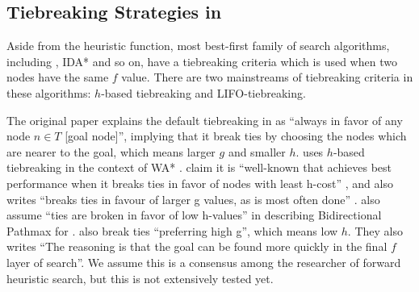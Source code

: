 


\subsection{Tiebreaking Strategies in \astar}

Aside from the heuristic function, most best-first family of search
algorithms, including \astar, IDA* and so on, have a tiebreaking criteria which is used
when two nodes have the same $f$ value.
There are two mainstreams of tiebreaking criteria in these algorithms:
$h$-based tiebreaking and LIFO-tiebreaking.

The original \astar paper \cite{hart1968formal} explains the default
tiebreaking in \astar as ``always in favor of any node $n \in T$ [goal
node]'', implying that it break ties by choosing the nodes which are
nearer to the goal, which means larger $g$ and smaller $h$.
\citeauthor{Korf1985depth} uses $h$-based tiebreaking in the context of WA*
\cite{korf1993linear}.  \citeauthor{hansen2007anytime} claim it is
``well-known that \astar achieves best performance when it breaks ties
in favor of nodes with least h-cost'' \cite{hansen2007anytime}, and
\citeauthor{holte2010common} also writes ``\astar breaks ties in favour
of larger g values, as is most often done'' \cite{holte2010common}.
\citeauthor{felner2011inconsistent} also assume ``ties are broken in
favor of low h-values'' in describing Bidirectional Pathmax for \astar.
\citeauthor{burns2012implementing} also break ties ``preferring high
g'', which means low $h$. They also writes ``The reasoning is that the
goal can be found more quickly in the final $f$ layer of search''. We
assume this is a consensus among the researcher of forward heuristic
search, but this is not extensively tested yet.

